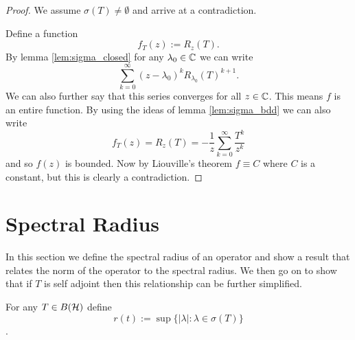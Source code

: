 \documentclass{unswmaths}
\begin{document}
\begin{lemma}
\end{lemma}
\begin{proof}
	We assume $ \sigma(T) \neq \emptyset $ and arrive at a contradiction.
	
	Define a function $$ f_{T}(z) := R_{z}(T). $$
	By lemma \ref{lem:sigma_closed} for any $ \lambda_0 \in \mathbb{C} $ we can write
	$$ \sum_{k=0}^\infty (z-\lambda_0)^k R_{\lambda_0}(T)^{k+1}. $$
	We can also further say that this series converges for all $ z \in \mathbb{C} $.
	This means $ f $ is an entire function.
	By using the ideas of lemma \ref{lem:sigma_bdd} we can also write 
	$$
		f_T(z) = R_{z}(T) = - \frac{1}{z} \sum_{k=0}^\infty \frac{T^k}{z^k}
	$$
	and so $ f(z) $ is bounded.
	Now by Liouville's theorem $ f \equiv C $ where  $ C $ is a constant, but this is clearly a contradiction.
\end{proof}

\section*{Spectral Radius}

In this section we define the spectral radius of an operator and show a result that relates the norm of the operator
to the spectral radius. We then go on to show that if $ T $ is self adjoint then this relationship can be further simplified.

\begin{definition}
	For any $ T \in B(\mathcal{H}) $ define $$ r(t) := \sup \{ |\lambda| : \lambda \in \sigma(T) \} $$.
\end{definition}
\end{document}
